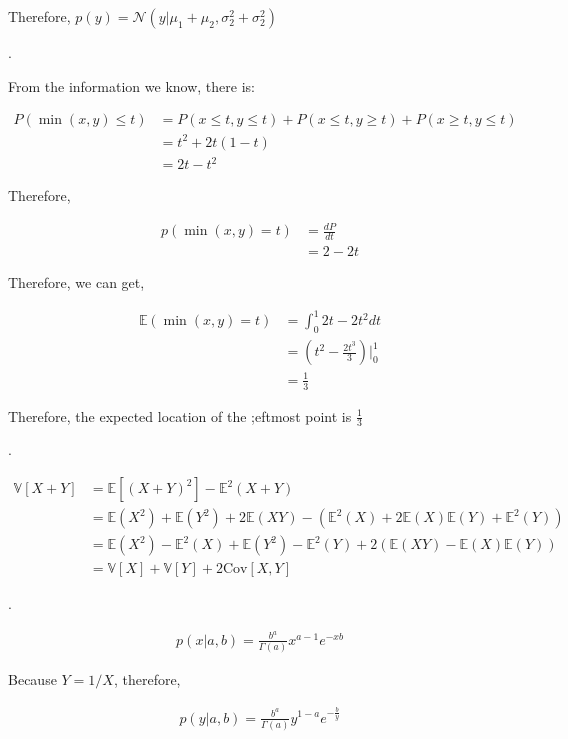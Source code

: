 \documentclass[UTF8]{article}
\begin{document}
Therefore, $p(y) = \mathcal{N}(y|\mu_1+\mu_2, \sigma_2^2+\sigma_2^2)$

.

From the information we know, there is:

\begin{align*}
    P(\min(x,y)\leq t) &= P(x\leq t , y \leq t) + P(x\leq t , y \ge t) + P(x\ge t , y \leq t) \\
    &=t^2 + 2t(1-t)\\
    &=2t - t^2
\end{align*}

Therefore,

\begin{align*}
    p(\min(x,y)= t) &= \frac{dP}{dt}\\
    &=2 - 2t
\end{align*}

Therefore, we can get,

\begin{align*}
    \mathbb{E}(\min(x,y)= t) &= \int_{0}^{1}2t-2t^2dt\\
    &=(t^2 - \frac{2t^3}{3})|_{0}^{1}\\
    &=\frac{1}{3}
\end{align*}

Therefore, the expected location of the ;eftmost point is $\frac{1}{3}$

.

\begin{align*}
    \mathbb{V}[X+Y] &= \mathbb{E}[(X+Y)^2] - \mathbb{E}^2(X+Y)\\
                    &= \mathbb{E}(X^2) + \mathbb{E}(Y^2) + 2\mathbb{E}(XY) - (\mathbb{E}^2(X)+2\mathbb{E}(X)\mathbb{E}(Y)+\mathbb{E}^2(Y))\\
                    &= \mathbb{E}(X^2) - \mathbb{E}^2(X) + \mathbb{E}(Y^2) - \mathbb{E}^2(Y) + 2(\mathbb{E}(XY) - \mathbb{E}(X)\mathbb{E}(Y))\\
                    &= \mathbb{V}[X] + \mathbb{V}[Y] + 2\text{Cov}[X, Y]
\end{align*}

.

\begin{align*}
    p(x|a, b) = \frac{b^a}{\Gamma(a)}x^{a-1}e^{-xb}
\end{align*}

Because $Y=1/X$, therefore,

\begin{align*}
    p(y|a, b) = \frac{b^a}{\Gamma(a)}y^{1-a}e^{-\frac{b}{y}}
\end{align*}
\end{document}
